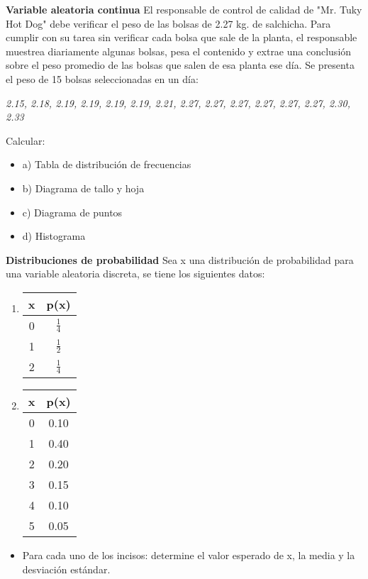 \documentclass{../oxmathproblems}
\begin{document}
\begin{questions}
\miquestion \textbf{Variable aleatoria continua}
El responsable de control de calidad de "Mr. Tuky Hot Dog" debe verificar el peso de las bolsas de 2.27 kg. de salchicha. Para cumplir con su tarea sin verificar cada bolsa que sale de la planta, el responsable muestrea diariamente algunas bolsas, pesa el contenido y extrae una conclusión sobre el peso promedio de las bolsas que salen de esa planta ese día. Se presenta el peso de 15 bolsas seleccionadas en un día: 

\textit{2.15, 2.18, 2.19, 2.19, 2.19, 2.19, 2.21, 2.27, 2.27, 2.27, 2.27, 2.27, 2.27, 2.30, 2.33}

Calcular: 
\begin{itemize}
\item a) Tabla de distribución de frecuencias
\item b) Diagrama de tallo y hoja
\item c) Diagrama de puntos 
\item d) Histograma 
\end{itemize}




\textbf{Distribuciones de probabilidad} 
\miquestion Sea x una distribución de probabilidad para una variable aleatoria discreta, se tiene los siguientes datos: 


\begin{enumerate}
\item 
\begin{tabular}{| c | c |}
\hline
x & p(x) \\ \hline
0 & $\frac{1}{4}$ \\ \hline
1 &$\frac{1}{2}$\\ \hline
2 & $\frac{1}{4}$ \\ \hline
\end{tabular}

\item  
\begin{tabular}{| c | c |}
\hline
x & p(x) \\ \hline
0 & 0.10 \\ \hline
1 &  0.40 \\ \hline
2 & 0.20 \\ \hline
3 & 0.15 \\ \hline
4 & 0.10 \\ \hline
5 & 0.05 \\ \hline
\end{tabular}
\end{enumerate}

\begin{itemize}
\item Para cada uno de los incisos: determine el valor esperado de x, la media y la desviación estándar. 
\end{itemize}



\end{questions}
\end{document}
